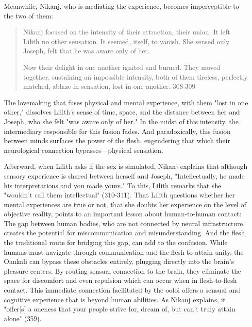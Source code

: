 \documentclass[11pt]{article}
\begin{document}
\begin{enumerate}
Meanwhile, Nikanj, who is mediating the experience, becomes
imperceptible to the two of them:
\begin{quote}
Nikanj focused on the intensity of their attraction, their union. It
left Lilith no other sensation. It seemed, itself, to vanish. She
sensed only Joseph, felt that he was aware only of her. 

Now their delight in one another ignited and burned. They moved
together, sustaining an impossible intensity, both of them tireless,
perfectly matched, ablaze in sensation, lost in one another. 308-309
\end{quote}
The lovemaking that fuses physical and mental experience, with them
"lost in one other," dissolves Lilith's sense of time, space, and the
distance between her and Joseph, who she felt "was aware only of her."
In the midst of this intensity, the intermediary responsible for this
fusion fades. And paradoxically, this fusion between minds surfaces
the power of the flesh, engendering that which their neurological
connection bypasses---physical sensation. 

Afterward, when Lilith asks if the sex is simulated, Nikanj explains
that although sensory experience is shared between herself and Joseph,
"Intellectually, he made his interpretations and you made yours." To
this, Lilith remarks that she "wouldn't call them intellectual"
(310-311). That Lilith questions whether her mental experiences are
true or not, that she doubts her experience on the level of objective
reality, points to an important lesson about human-to-human contact:
The gap between human bodies, who are not connected by neural
infrastructure, creates the potential for miscommunication and
misunderstanding. And the flesh, the traditional route for bridging
this gap, can add to the confusion. While humans must navigate through
communication and the flesh to attain unity, the Oankali can bypass
these obstacles entirely, plugging directly into the brain's pleasure
centers. By routing sensual connection to the brain, they eliminate
the space for discomfort and even repulsion which can occur when in
flesh-to-flesh contact. This immediate connection facilitated by the
ooloi offers a sensual and cognitive experience that is beyond human
abilities. As Nikanj explains, it "offer[s] a oneness that your people
strive for, dream of, but can't truly attain alone" (359).


\end{enumerate}
\end{document}
